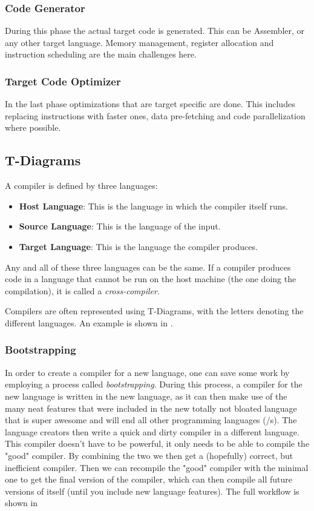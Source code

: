 \documentclass{article}
\begin{document}
\subsubsection{Code Generator}
During this phase the actual target code is generated.
This can be Assembler, or any other target language.
Memory management, register allocation and instruction scheduling are the main challenges here.

\subsubsection{Target Code Optimizer}
In the last phase optimizations that are target specific are done.
This includes replacing instructions with faster ones, data pre-fetching and code parallelization where possible.

\subsection{T-Diagrams}
A compiler is defined by three languages:
\begin{itemize}
	\item \textbf{Host Language}: This is the language in which the compiler itself runs.
	\item \textbf{Source Language}: This is the language of the input.
	\item \textbf{Target Language}: This is the language the compiler produces.
\end{itemize}

Any and all of these three languages can be the same.
If a compiler produces code in a language that cannot be run on the host machine (the one doing the compilation), it is called a \emph{cross-compiler}.

Compilers are often represented using T-Diagrams, with the letters denoting the different languages.
An example is shown in .

\subsubsection{Bootstrapping}
In order to create a compiler for a new language, one can save some work by employing a process called \emph{bootstrapping}.
During this process, a compiler for the new language is written in the new language, as it can then make use of the many neat features that were included in the new totally not bloated language that is super awesome and will end all other programming languages (/s).
The language creators then write a quick and dirty compiler in a different language.
This compiler doesn't have to be powerful, it only needs to be able to compile the "good" compiler.
By combining the two we then get a (hopefully) correct, but inefficient compiler.
Then we can recompile the "good" compiler with the minimal one to get the final version of the compiler, which can then compile all future versions of itself (until you include new language features).
The full workflow is shown in 
\end{document}
